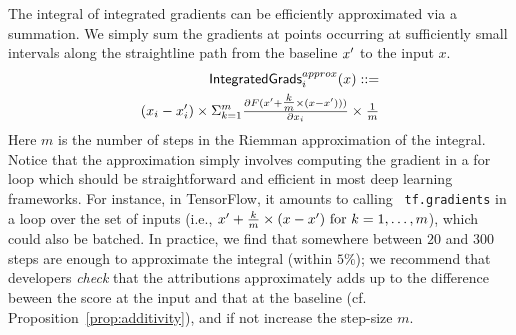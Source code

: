 The integral of integrated gradients can be efficiently approximated via a summation. We simply sum the gradients at points occurring at
sufficiently small intervals along the straightline path from
the baseline $x'$ to the input $x$.
\begin{equation}
  \begin{split}
    \mathsf{IntegratedGrads}_i^{approx}(x) ::= \\
    (x_i-x'_i)\times \Sigma_{k=1}^m  \tfrac{\partial F(x' + \tfrac{k}{m}\times(x-x')))}{\partial x_i}\times\tfrac{1}{m}
  \end{split}
\end{equation}
Here $m$ is the number of steps in the Riemman approximation of the
integral.  Notice that the approximation simply involves computing the
gradient in a for loop which should be straightforward and efficient
in most deep learning frameworks. For instance, in TensorFlow, it amounts to calling {\tt
  tf.gradients} in a loop over the set of inputs (i.e.,
$x' + \tfrac{k}{m}\times(x-x')~\mbox{for}~ k = 1, \ldots, m$), which
could also be batched.
In practice, we find that somewhere between $20$ and $300$ steps are enough to approximate
the integral (within $5\%$); we recommend that developers \emph{check} that the attributions
approximately adds up to the difference beween the score at the input and that at the
baseline (cf. Proposition~\ref{prop:additivity}), and if not increase the step-size $m$.




